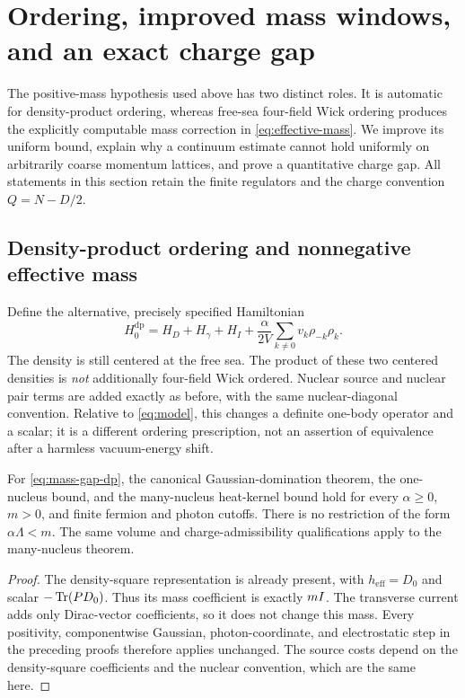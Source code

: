 \section{Ordering, improved mass windows, and an exact charge gap}
\label{sec:mass-gap-round2}

The positive-mass hypothesis used above has two distinct roles. It is
automatic for density-product ordering, whereas free-sea four-field Wick
ordering produces the explicitly computable mass correction in
\eqref{eq:effective-mass}. We improve its uniform bound, explain why a
continuum estimate cannot hold uniformly on arbitrarily coarse momentum
lattices, and prove a quantitative charge gap. All statements in this
section retain the finite regulators and the charge convention $Q=N-D/2$.

\subsection{Density-product ordering and nonnegative effective mass}
\label{subsec:mass-gap-ordering}

Define the alternative, precisely specified Hamiltonian
\begin{equation}
 H^{\mathrm{dp}}_0=H_D+H_\gamma+H_I+
 \frac{\alpha}{2V}\sum_{k\ne0}v_k\rho_{-k}\rho_k.
 \label{eq:mass-gap-dp}
\end{equation}
The density is still centered at the free sea. The product of these two
centered densities is \emph{not} additionally four-field Wick ordered.
Nuclear source and nuclear pair terms are added exactly as before, with
the same nuclear-diagonal convention. Relative to \eqref{eq:model}, this
changes a definite one-body operator and a scalar; it is a different
ordering prescription, not an assertion of equivalence after a harmless
vacuum-energy shift.

\begin{corollary}
\label{cor:mass-gap-dp}
For \eqref{eq:mass-gap-dp}, the canonical Gaussian-domination theorem,
the one-nucleus bound, and the many-nucleus heat-kernel bound hold for
every $\alpha\ge0$, $m>0$, and finite fermion and photon cutoffs.
There is no restriction of the form $\alpha\Lambda<m$.
The same volume and charge-admissibility qualifications apply to the
many-nucleus theorem.
\end{corollary}
\begin{proof}
The density-square representation is already present, with
$h_{\mathrm{eff}}=D_0$ and scalar $-\operatorname{Tr}(PD_0)$. Thus its mass coefficient
is exactly $mI$. The transverse current adds only Dirac-vector
coefficients, so it does not change this mass. Every positivity,
componentwise Gaussian, photon-coordinate, and electrostatic step in
the preceding proofs therefore applies unchanged. The source costs
depend on the density-square coefficients and the nuclear convention,
which are the same here.
\end{proof}

